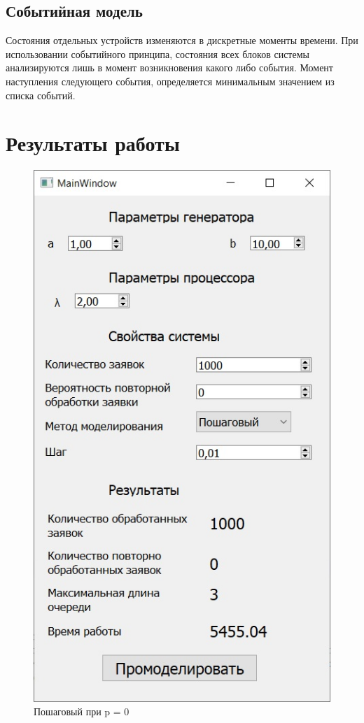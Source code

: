 \documentclass[14pt, a4paper]{extarticle}
\begin{document}
\subsection*{Событийная модель}
Состояния отдельных устройств изменяются в дискретные моменты времени. При использовании событийного принципа, состояния всех блоков системы анализируются лишь в момент возникновения какого либо события. Момент наступления следующего события, определяется минимальным значением из списка событий.
\newpage
\section*{Результаты работы}
\begin{figure}[h!]
	\centering
	\includegraphics[scale=0.6]{source/step0.jpg}
	\caption{Пошаговый при p = 0}
\end{figure}
\end{document}
